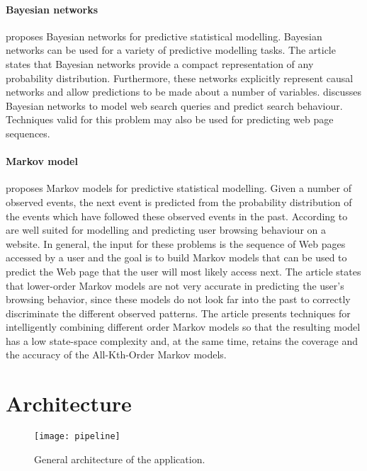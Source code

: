 \documentclass[a4paper,11pt]{article}
\begin{document}
\paragraph{Bayesian networks} \cite{predictive-statistical-models} proposes Bayesian networks for predictive statistical modelling. Bayesian networks can be used for a variety of predictive modelling tasks. The article states that Bayesian networks provide a compact representation of any probability distribution. Furthermore, these networks explicitly represent causal networks and allow predictions to be made about a number of variables. \cite{search-prediction} discusses Bayesian networks to model web search queries and predict search behaviour. Techniques valid for this problem may also be used for predicting web page sequences.

\paragraph{Markov model} \cite{predictive-statistical-models} proposes Markov models for predictive statistical modelling. Given a number of observed events, the next event is predicted from the probability distribution of the events which have followed these observed events in the past. According to \cite{markov-web-page-accesses} are well suited for modelling and predicting user browsing behaviour on a website. In general, the input for these problems is the sequence of Web pages accessed by a user and the goal is to build Markov models that can be used to predict the Web page that the user will most likely access next. The article states that lower-order Markov models are not very accurate in predicting the user's browsing behavior, since these models do not look far into the past to correctly discriminate the different observed patterns. The article presents techniques for intelligently combining different order Markov models so that the resulting model has a low state-space complexity and, at the same time, retains the coverage and the accuracy of the All-Kth-Order Markov models.



\section{Architecture}

\begin{figure}[here]
\texttt{[image: pipeline]}
\caption{General architecture of the application.}
\label{pipeline}
\end{figure}
\end{document}
